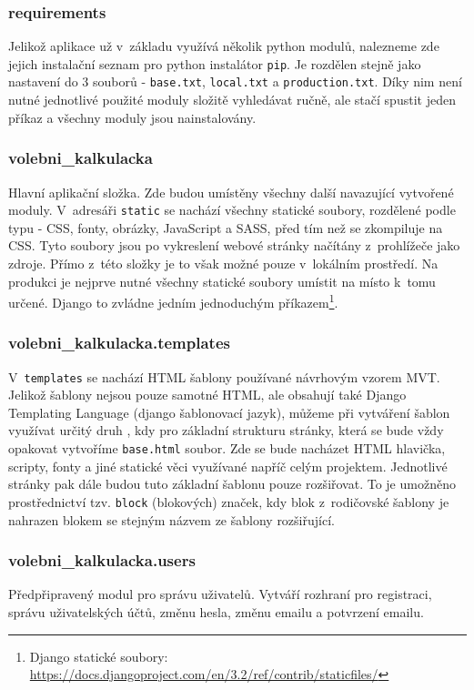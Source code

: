 \subsubsection{requirements}
Jelikož aplikace už v~základu využívá několik python modulů, nalezneme zde jejich instalační seznam pro python instalátor \texttt{pip}. Je rozdělen stejně jako nastavení do 3 souborů - \texttt{base.txt}, \texttt{local.txt} a \texttt{production.txt}. Díky nim není nutné jednotlivé použité moduly složitě vyhledávat ručně, ale stačí spustit jeden příkaz a všechny moduly jsou nainstalovány.

\subsubsection{volebni\_kalkulacka}
Hlavní aplikační složka. Zde budou umístěny všechny další navazující vytvořené moduly. V~adresáři \texttt{static} se nachází všechny statické soubory, rozdělené podle typu - CSS, fonty, obrázky, JavaScript a SASS, před tím než se zkompiluje na CSS. Tyto soubory jsou po vykreslení webové stránky načítány z~prohlížeče jako zdroje. Přímo z~této složky je to však možné pouze v~lokálním prostředí. Na produkci je nejprve nutné všechny statické soubory umístit na místo k~tomu určené. Django to zvládne jedním jednoduchým příkazem\footnote{Django statické soubory: \url{https://docs.djangoproject.com/en/3.2/ref/contrib/staticfiles/}}.

\subsubsection{volebni\_kalkulacka.templates}
\par V~\texttt{templates} se nachází HTML šablony používané návrhovým vzorem MVT. Jelikož šablony nejsou pouze samotné HTML, ale obsahují také Django Templating Language (django šablonovací jazyk), můžeme při vytváření šablon využívat určitý druh , kdy pro základní strukturu stránky, která se bude vždy opakovat vytvoříme \texttt{base.html} soubor. Zde se bude nacházet HTML hlavička, scripty, fonty a jiné statické věci využívané napříč celým projektem. Jednotlivé stránky pak dále budou tuto základní šablonu pouze rozšiřovat. To je umožněno prostřednictví tzv. \texttt{block} (blokových) značek, kdy blok z~rodičovské šablony je nahrazen blokem se stejným názvem ze šablony rozšiřující.

\subsubsection{volebni\_kalkulacka.users}
Předpřipravený modul pro správu uživatelů. Vytváří rozhraní pro registraci, správu uživatelských účtů, změnu hesla, změnu emailu a potvrzení emailu.
 
